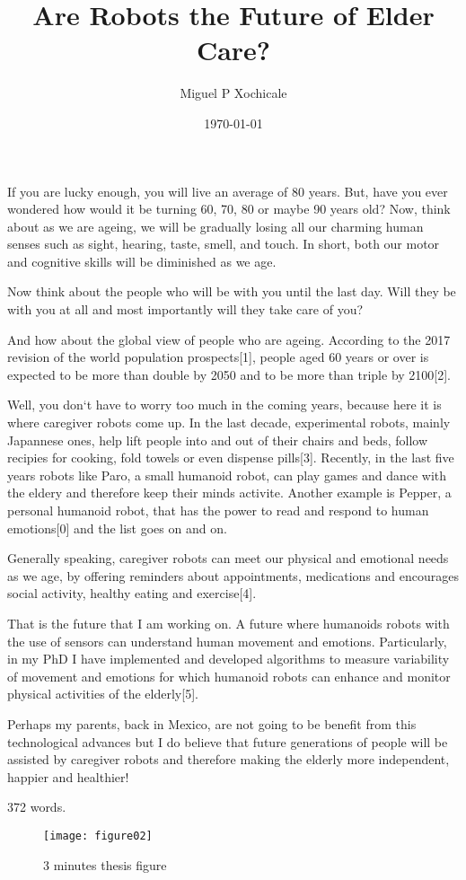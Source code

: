 \documentclass[12pt]{article}
\author{Miguel P Xochicale}
\title{ Are Robots the Future of Elder Care?  }
\date{\today}
\begin{document}
\maketitle

If you are lucky enough, you will live an average of 80 years.
But, have you ever wondered how would it be turning 60, 70, 80 or maybe 90 years old?
Now, think about as we are ageing, we will be gradually losing all our
charming human senses such as sight, hearing, taste, smell, and touch.
In short, both our motor and cognitive skills will be diminished as we age.

Now think about the people who will be with you until the last day.
Will they be with you at all 
and most importantly will they take care of you?

And how about the global view of people who are ageing.
According to the 2017 revision of the world population prospects[1], 
people aged 60 years or over
is expected to be more than double by 2050 and to be more than triple by 2100[2].

Well, you don`t have to worry too much in the coming years, 
because here it is where caregiver robots come up.
In the last decade, experimental robots, mainly Japannese ones, help lift people into and out of their chairs and beds,
follow recipies for cooking, fold towels or even dispense pills[3].
Recently, in the last five years robots like
Paro, a small humanoid robot, can play games and dance with the eldery
and therefore keep their minds activite.
Another example is Pepper, a personal humanoid robot, that has the power 
to read and respond to human emotions[0]
and the list goes on and on.

Generally speaking, caregiver robots can meet our physical and emotional needs as we age,
by offering reminders about appointments, medications 
and encourages social activity, healthy eating and exercise[4].

That is the future that I am working on.
A future where humanoids robots with the use of sensors can understand human movement and emotions.
Particularly, in my PhD I have implemented and developed algorithms to measure 
variability of movement and emotions 
for which humanoid robots can enhance and monitor physical activities of the elderly[5].

Perhaps my parents, back in Mexico, are not going to be benefit 
from this technological advances 
but I do believe that future generations of people will be assisted by caregiver robots
and therefore making the elderly more independent, happier and healthier!

372 words. 



\newpage

\begin{sidewaysfigure}
\centering
\texttt{[image: figure02]}
\caption{3 minutes thesis figure}
\end{sidewaysfigure}
\end{document}
